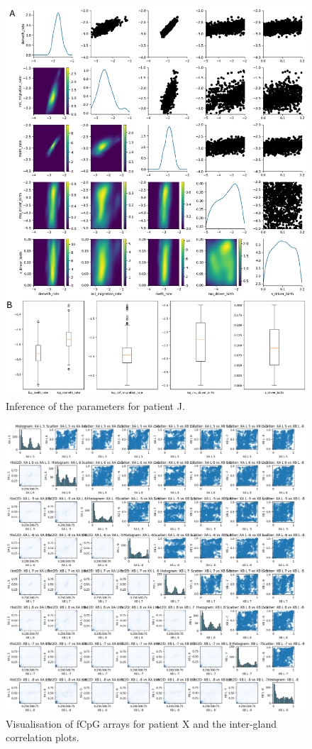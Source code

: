 \begin{figure}[h]
\centering
\includegraphics[width=\textwidth]{Chapter_5/figures/inference_J.pdf}
\caption{Inference of the parameters for patient J.}
\label{fig:inference_J}
\end{figure}

\begin{figure}[ht]
\centering
\includegraphics[width=\textwidth]{Chapter_5/figures/fCpG_loci_X.png}
\caption{Visualisation of fCpG arrays for patient X and the inter-gland
    correlation plots.}
\label{fig:vis_X}
\end{figure}

